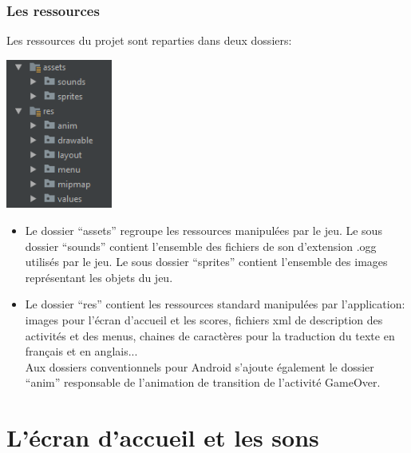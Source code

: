 \documentclass{article}
\begin{document}
\subsubsection{Les ressources}
Les ressources du projet sont reparties dans deux dossiers:
\begin{center}
  \includegraphics[width=3.5cm]{res.png}
\end{center}
\begin{itemize}
  \item Le dossier \enquote{assets} regroupe les ressources manipulées par le jeu. 
  Le sous dossier \enquote{sounds} contient l'ensemble des fichiers de son d'extension .ogg utilisés par le jeu.
  Le sous dossier \enquote{sprites} contient l'ensemble des images représentant les objets du jeu.
  \item Le dossier \enquote{res} contient les ressources standard manipulées par l'application: images pour l'écran d'accueil et les scores, fichiers xml de description des activités et des menus, chaines de caractères pour la traduction du texte en français et en anglais...\\
  Aux dossiers conventionnels pour Android s'ajoute également le dossier \enquote{anim} responsable de l'animation de transition de l'activité GameOver.
\end{itemize}

\section{L'écran d'accueil et les sons}
\end{document}
